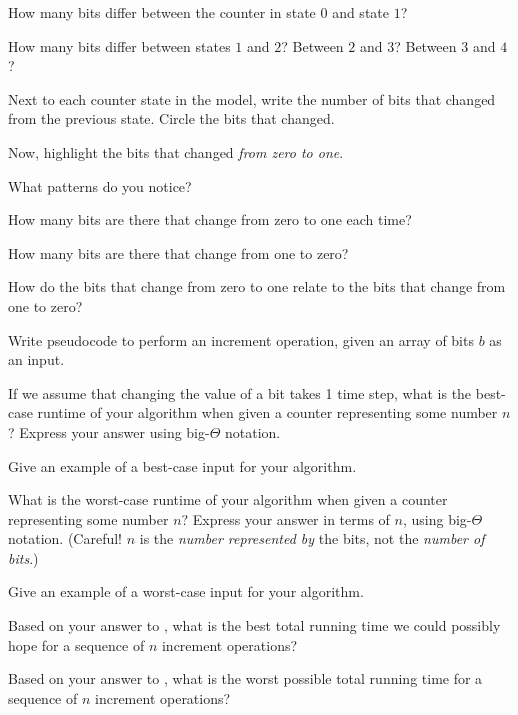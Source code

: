 \documentclass{tufte-handout}
\begin{document}
\begin{questions}
  \item How many bits differ between the counter in state $0$ and
    state $1$?
  \item How many bits differ between states $1$ and $2$?  Between $2$
    and $3$?  Between $3$ and $4$?
  \item Next to each counter state in the model, write the number of
    bits that changed from the previous state.  Circle the bits that
    changed.
  \item Now, highlight the bits that changed \emph{from zero to one}.
  \item What patterns do you notice?
  \item How many bits are there that change from zero to one each
    time?
  \item How many bits are there that change from one to zero?
  \item How do the bits that change from zero to one relate to the
    bits that change from one to zero?
  \item Write pseudocode to perform an increment operation, given an
    array of bits $b$ as an input. \vspace{1in}
  \item \label{q:inc-best} If we assume that changing the value of a
    bit takes 1 time step, what is the best-case runtime of your
    algorithm when given a counter representing some number $n$?
    Express your answer using big-$\Theta$ notation.
  \item Give an example of a best-case input for your algorithm.
  \item \label{q:inc-worst} What is the worst-case runtime of your
    algorithm when given a counter representing some number $n$?
    Express your answer in terms of $n$, using big-$\Theta$
    notation. (Careful!  $n$ is the \emph{number represented by} the
    bits, not the \emph{number of bits}.)
  \item Give an example of a worst-case input for your algorithm.
  \item Based on your answer to , what is the best
    total running time we could possibly hope for a sequence of $n$
    increment operations?
  \item \label{q:worst-total} Based on your answer to
    , what is the worst possible total running time
    for a sequence of $n$ increment operations?
  \end{questions}
\end{document}
